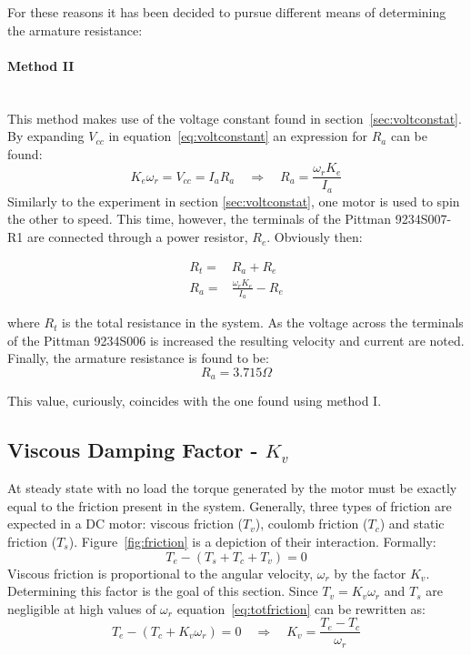 For these reasons it has been decided to pursue different means of determining the armature resistance:
\paragraph{Method II}~\\
This method makes use of the voltage constant found in section~\ref{sec:voltconstat}.
By expanding $V_{cc}$ in equation~\ref{eq:voltconstant} an expression for $R_a$ can be found:
\begin{equation}
	\label{eq:voltconstantexpanded}
	K_e\omega_r = V_{cc} = I_aR_a\quad \Rightarrow \quad R_a = \frac{\omega_rK_e}{I_a}
\end{equation}
Similarly to the experiment in section \ref{sec:voltconstat}, one motor is used to spin the other to speed.
This time, however, the terminals of the Pittman 9234S007-R1 are connected through a power resistor, $R_e$.
Obviously then:

\begin{eqnarray}
	R_t =& R_a + R_e\\
	R_a =& \frac{\omega_rK_e}{I_a}-R_e
\end{eqnarray}

where $R_t$ is the total resistance in the system.
As the voltage across the terminals of the Pittman 9234S006 is increased the resulting velocity and current are noted.
Finally, the armature resistance is found to be:
$$R_a = 3.715\Omega$$

This value, curiously, coincides with the one found using method I.

\subsection{Viscous Damping Factor - $K_v$}
\label{sec:viscous}
At steady state with no load the torque generated by the motor must be exactly equal to the friction present in the system.
Generally, three types of friction are expected in a DC motor: viscous friction ($T_v$), coulomb friction ($T_c$) and static friction ($T_s$).
Figure~\ref{fig:friction} is a depiction of their interaction.
Formally:
\begin{equation}
	\label{eq:totfriction}
	T_e-(T_s+T_c+T_v)=0
\end{equation}
Viscous friction is proportional to the angular velocity, $\omega_r$ by the factor $K_v$.
Determining this factor is the goal of this section.
Since $T_v=K_v\omega_r$ and $T_s$ are negligible at high values of $\omega_r$ equation~\ref{eq:totfriction} can be rewritten as:
\begin{equation}
	\label{eq:frictionnostatic}
	T_e-(T_c+K_v\omega_r)=0 \quad \Rightarrow \quad K_v = \frac{T_e-T_c}{\omega_r}
\end{equation}

